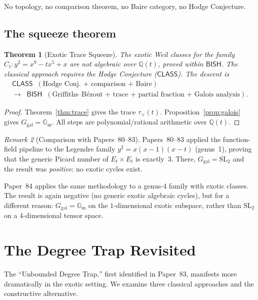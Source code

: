 \documentclass[11pt]{article}
\theoremstyle{plain}
\newtheorem{theorem}{Theorem}[section]
\theoremstyle{definition}
\theoremstyle{remark}
\newtheorem{remark}[theorem]{Remark}
\newcommand{\Q}{\mathbb{Q}}
\newcommand{\SL}{\mathrm{SL}}
\newcommand{\Ggal}{G_{\mathrm{gal}}}
\newcommand{\Gm}{\mathbb{G}_{\mathrm{m}}}
\newcommand{\BISH}{\ensuremath{\mathsf{BISH}}}
\newcommand{\CLASS}{\ensuremath{\mathsf{CLASS}}}
\begin{document}
No topology, no comparison theorem, no Baire category, no Hodge Conjecture.

\subsection{The squeeze theorem}

\begin{theorem}[Exotic Trace Squeeze]\label{thm:main}
The exotic Weil classes for the family $C_t: y^2 = x^9 - tx^5 + x$ are
not algebraic over $\Q(t)$, proved within $\BISH$. The classical approach
requires the Hodge Conjecture (\CLASS). The descent is
\begin{gather*}
\CLASS \;\;(\text{Hodge Conj.\ + comparison + Baire})\\
\longrightarrow \;\; \BISH
\;\;(\text{Griffiths--B\'ezout + trace + partial fraction + Galois analysis}).
\end{gather*}
\end{theorem}

\begin{proof}
Theorem~\ref{thm:trace} gives the trace $\tau_+(t)$.
Proposition~\ref{prop:galois} gives $\Ggal = \Gm$.
All steps are polynomial/rational arithmetic over $\Q(t)$.
\end{proof}

\begin{remark}[Comparison with Papers~80--83]
Papers~80--83 applied the function-field pipeline to the Legendre
family $y^2 = x(x-1)(x-t)$ (genus~1), proving that the generic Picard
number of $E_t \times E_t$ is exactly~3. There, $\Ggal = \SL_2$ and the
result was \emph{positive}: no exotic cycles exist.

Paper~84 applies the same methodology to a genus-4 family with exotic
classes. The result is again negative (no generic exotic algebraic cycles),
but for a different reason: $\Ggal = \Gm$ on the $1$-dimensional exotic
subspace, rather than $\SL_2$ on a $4$-dimensional tensor space.
\end{remark}

\section{The Degree Trap Revisited}

The ``Unbounded Degree Trap,'' first identified in Paper~83, manifests
more dramatically in the exotic setting. We examine three classical
approaches and the constructive alternative.
\end{document}
